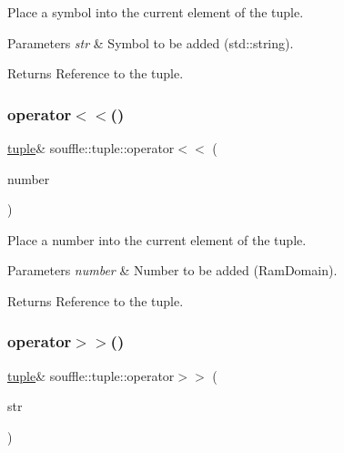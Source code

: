 Place a symbol into the current element of the tuple. 
\begin{DoxyParams}{Parameters}
{\em str} & Symbol to be added (std\+::string). \\
\hline
\end{DoxyParams}
\begin{DoxyReturn}{Returns}
Reference to the tuple. 
\end{DoxyReturn}
\mbox{\label{classsouffle_1_1tuple_a52d4b510d904ed1ea7f45d08771cdfbb}} 
\subsubsection{\texorpdfstring{operator$<$$<$()}{operator<<()}\hspace{0.1cm}{\footnotesize\ttfamily [2/2]}}
{\footnotesize\ttfamily \hyperlink{classsouffle_1_1tuple}{tuple}\& souffle\+::tuple\+::operator$<$$<$ (\begin{DoxyParamCaption}\item[{Ram\+Domain}]{number }\end{DoxyParamCaption})\hspace{0.3cm}{\ttfamily [inline]}}

Place a number into the current element of the tuple. 
\begin{DoxyParams}{Parameters}
{\em number} & Number to be added (Ram\+Domain). \\
\hline
\end{DoxyParams}
\begin{DoxyReturn}{Returns}
Reference to the tuple. 
\end{DoxyReturn}
\mbox{\label{classsouffle_1_1tuple_a3d1131d74b8b61cf8e445a155adaa046}} 
\subsubsection{\texorpdfstring{operator$>$$>$()}{operator>>()}\hspace{0.1cm}{\footnotesize\ttfamily [1/2]}}
{\footnotesize\ttfamily \hyperlink{classsouffle_1_1tuple}{tuple}\& souffle\+::tuple\+::operator$>$$>$ (\begin{DoxyParamCaption}\item[{std\+::string \&}]{str }\end{DoxyParamCaption})\hspace{0.3cm}{\ttfamily [inline]}}

